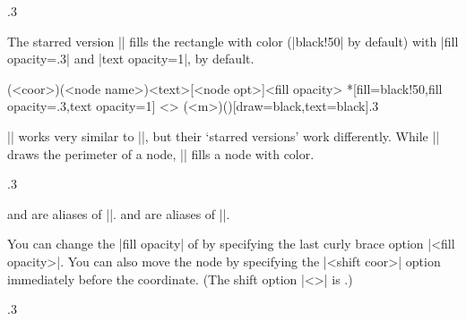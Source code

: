 \begin{tzcode}{.3}
\end{tzcode}

The starred version |\tznodeframe*| fills the rectangle with color (|black!50| by default) with |fill opacity=.3| and |text opacity=1|, by default.


\begin{tzdef}{}
             (<coor>)(<node name>){<text>}[<node opt>]{<fill opacity>}
 *[fill=black!50,fill opacity=.3,text opacity=1] <>
  (<m>)(){}[draw=black,text=black]{.3}
\end{tzdef}

\remark
|\tznodeframe| works very similar to |\tznode|, but their `starred versions' work differently.
While |\tznode*| draws the perimeter of a node, |\tznodeframe*| fills a node with color.

\begin{tzcode}{.3}
\end{tzcode}

\icmd{\tznoderectangle} and \icmd{\tznodebox} are aliases of |\tznodeframe|.
\icmd{\tznoderectangle*} and \icmd{\tznodebox*} are aliases of |\tznodeframe*|.


You can change the |fill opacity| of \icmd{\tznodeframe*} by specifying the last curly brace option |{<fill opacity>}|. You can also move the node by specifying the |<shift coor>| option immediately before the coordinate.
(The  shift option |<>| is .)


\begin{tzcode}{.3}
\end{tzcode}

